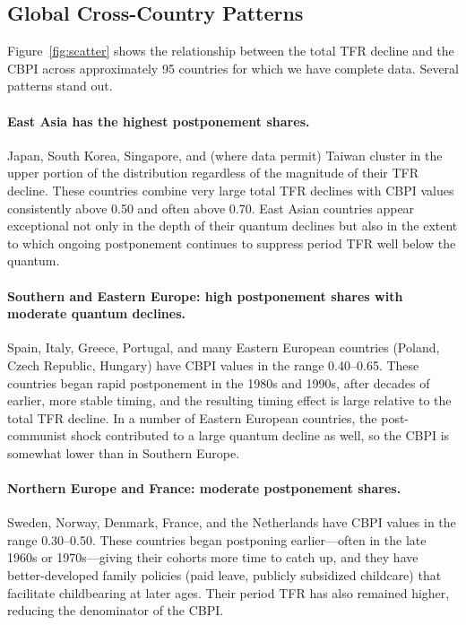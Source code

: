\documentclass[12pt]{article}
\begin{document}
\subsection{Global Cross-Country Patterns}

Figure~\ref{fig:scatter} shows the relationship between the total TFR
decline and the CBPI across approximately 95 countries for which we
have complete data.  Several patterns stand out.

\paragraph{East Asia has the highest postponement shares.}
Japan, South Korea, Singapore, and (where data permit) Taiwan cluster
in the upper portion of the distribution regardless of the magnitude of
their TFR decline.  These countries combine very large total TFR
declines with CBPI values consistently above 0.50 and often above 0.70.
East Asian countries appear exceptional not only in the depth of their
quantum declines but also in the extent to which ongoing postponement
continues to suppress period TFR well below the quantum.

\paragraph{Southern and Eastern Europe: high postponement shares with
moderate quantum declines.}
Spain, Italy, Greece, Portugal, and many Eastern European countries
(Poland, Czech Republic, Hungary) have CBPI values in the range
0.40--0.65.  These countries began rapid postponement in the 1980s and
1990s, after decades of earlier, more stable timing, and the resulting
timing effect is large relative to the total TFR decline.  In a
number of Eastern European countries, the post-communist shock
contributed to a large quantum decline as well, so the CBPI is
somewhat lower than in Southern Europe.

\paragraph{Northern Europe and France: moderate postponement shares.}
Sweden, Norway, Denmark, France, and the Netherlands have CBPI values
in the range 0.30--0.50.  These countries began postponing earlier---often
in the late 1960s or 1970s---giving their cohorts more time to
catch up, and they have better-developed family policies (paid leave,
publicly subsidized childcare) that facilitate childbearing at later
ages.  Their period TFR has also remained higher, reducing the
denominator of the CBPI.
\end{document}
